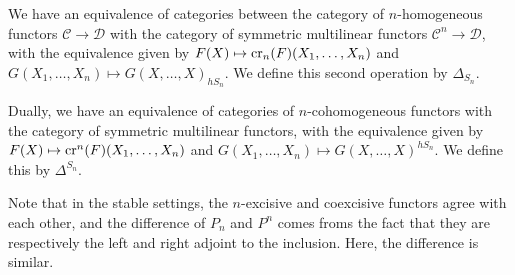 	\begin{thm}\label{N_homog_sym_multilinear}
		We have an equivalence of categories between the category of $n$-homogeneous functors $\mathcal{C}\to\mathcal{D}$ with the category of symmetric multilinear functors $\mathcal{C}^n\to\mathcal{D}$, with the equivalence given by $F(X)\mapsto\operatorname{\mathrm{cr}}_n(F)(X_1,\dots,X_n)$ and $G(X_1,\dots,X_n)\mapsto G(X,\dots,X)_{hS_n}$. We define this second operation by $\Delta_{S_n}$. 

		Dually, we have an equivalence of categories of $n$-cohomogeneous functors with the category of symmetric multilinear functors, with the equivalence given by $F(X)\mapsto\operatorname{\mathrm{cr}}^n(F)(X_1,\dots,X_n)$ and $G(X_1,\dots,X_n)\mapsto G(X,\dots,X)^{hS_n}$. We define this by $\Delta^{S_n}$. 
	\end{thm}
	\begin{remark}
		Note that in the stable settings, the $n$-excisive and coexcisive functors agree with each other, and the difference of $P_n$ and $P^n$ comes froms the fact that they are respectively the left and right adjoint to the inclusion. Here, the difference is similar. 
	\end{remark}

